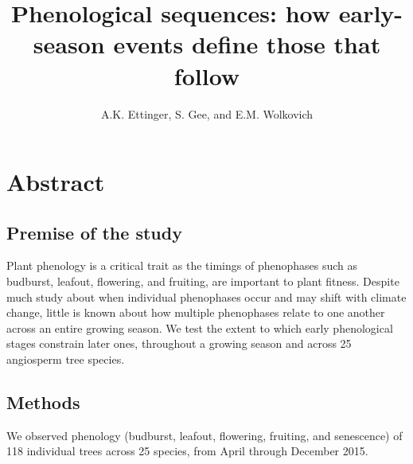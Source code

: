 \documentclass{article}
\begin{document}

\title{Phenological sequences: how early-season events define those that follow} %
\author{A.K. Ettinger, S. Gee, and E.M. Wolkovich}
\maketitle  %


\section*{Abstract}
\subsection*{Premise of the study}
Plant phenology is a critical trait as the timings of phenophases such as budburst, leafout, flowering, and fruiting, are important to plant fitness. Despite much study about when individual phenophases occur and may shift with climate change, little is known about how multiple phenophases relate to one another across an entire growing season. We test the extent to which early phenological stages constrain later ones, throughout a growing season and across 25 angiosperm tree species. 
\subsection*{Methods}
We observed phenology (budburst, leafout, flowering, fruiting, and senescence) of 118 individual trees across 25 species, from April through December 2015. 
\end{document}
